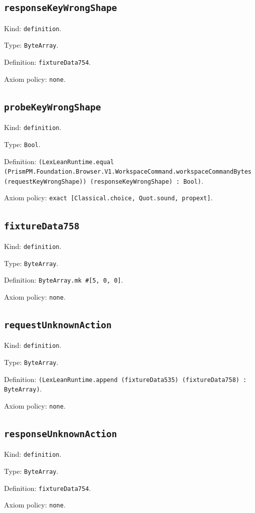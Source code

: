 \documentclass[11pt]{article}
\begin{document}
\subsection*{\texttt{responseKeyWrongShape}}
\noindent Kind: \texttt{definition}.\par
\noindent Type: \texttt{ByteArray}.\par
\noindent Definition: \texttt{fixtureData754}.\par
\noindent Axiom policy: \texttt{none}.\par
\subsection*{\texttt{probeKeyWrongShape}}
\noindent Kind: \texttt{definition}.\par
\noindent Type: \texttt{Bool}.\par
\noindent Definition: \texttt{(LexLeanRuntime.equal (PrismPM.Foundation.Browser.V1.WorkspaceCommand.workspaceCommandBytes (requestKeyWrongShape)) (responseKeyWrongShape) : Bool)}.\par
\noindent Axiom policy: \texttt{exact [Classical.choice, Quot.sound, propext]}.\par
\subsection*{\texttt{fixtureData758}}
\noindent Kind: \texttt{definition}.\par
\noindent Type: \texttt{ByteArray}.\par
\noindent Definition: \texttt{ByteArray.mk \#[5, 0, 0]}.\par
\noindent Axiom policy: \texttt{none}.\par
\subsection*{\texttt{requestUnknownAction}}
\noindent Kind: \texttt{definition}.\par
\noindent Type: \texttt{ByteArray}.\par
\noindent Definition: \texttt{(LexLeanRuntime.append (fixtureData535) (fixtureData758) : ByteArray)}.\par
\noindent Axiom policy: \texttt{none}.\par
\subsection*{\texttt{responseUnknownAction}}
\noindent Kind: \texttt{definition}.\par
\noindent Type: \texttt{ByteArray}.\par
\noindent Definition: \texttt{fixtureData754}.\par
\noindent Axiom policy: \texttt{none}.\par
\end{document}
